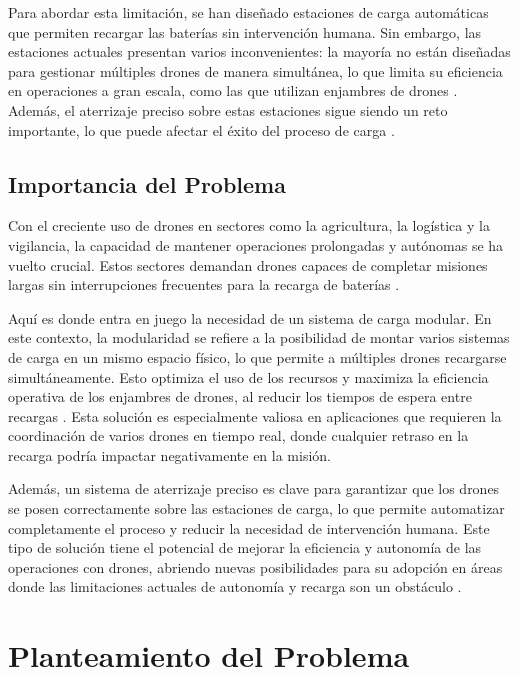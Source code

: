 Para abordar esta limitación, se han diseñado estaciones de carga automáticas que permiten recargar las baterías sin intervención humana. Sin embargo, las estaciones actuales presentan varios inconvenientes: la mayoría no están diseñadas para gestionar múltiples drones de manera simultánea, lo que limita su eficiencia en operaciones a gran escala, como las que utilizan enjambres de drones \cite{cite6}. Además, el aterrizaje preciso sobre estas estaciones sigue siendo un reto importante, lo que puede afectar el éxito del proceso de carga \cite{cite7}.

\subsection{Importancia del Problema}

Con el creciente uso de drones en sectores como la agricultura, la logística y la vigilancia, la capacidad de mantener operaciones prolongadas y autónomas se ha vuelto crucial. Estos sectores demandan drones capaces de completar misiones largas sin interrupciones frecuentes para la recarga de baterías \cite{cite8}.

Aquí es donde entra en juego la necesidad de un sistema de carga modular. En este contexto, la modularidad se refiere a la posibilidad de montar varios sistemas de carga en un mismo espacio físico, lo que permite a múltiples drones recargarse simultáneamente. Esto optimiza el uso de los recursos y maximiza la eficiencia operativa de los enjambres de drones, al reducir los tiempos de espera entre recargas \cite{cite9}. Esta solución es especialmente valiosa en aplicaciones que requieren la coordinación de varios drones en tiempo real, donde cualquier retraso en la recarga podría impactar negativamente en la misión.

Además, un sistema de aterrizaje preciso es clave para garantizar que los drones se posen correctamente sobre las estaciones de carga, lo que permite automatizar completamente el proceso y reducir la necesidad de intervención humana. Este tipo de solución tiene el potencial de mejorar la eficiencia y autonomía de las operaciones con drones, abriendo nuevas posibilidades para su adopción en áreas donde las limitaciones actuales de autonomía y recarga son un obstáculo \cite{cite10}.

\section{Planteamiento del Problema}

